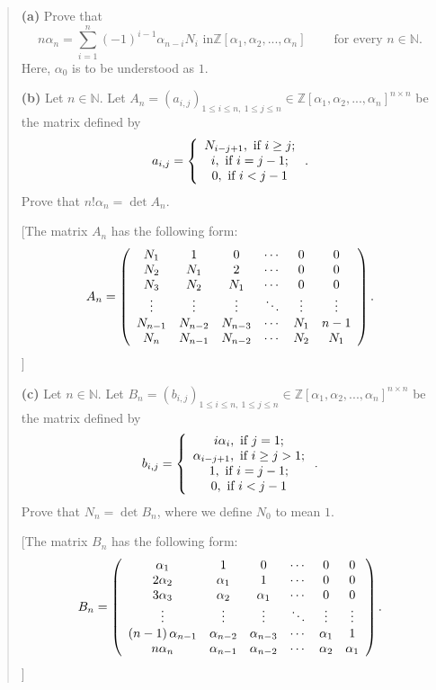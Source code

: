 \documentclass[numbers=enddot,12pt,final,onecolumn,notitlepage]{scrartcl}%
\begin{document}
\begin{quotation}
\textbf{(a)} Prove that
\[
n\alpha_{n}=\sum_{i=1}^{n}\left(  -1\right)  ^{i-1}\alpha_{n-i}N_{i}\text{ in
}\mathbb{Z}\left[  \alpha_{1},\alpha_{2},...,\alpha_{n}\right]
\ \ \ \ \ \ \ \ \ \ \text{for every }n\in\mathbb{N}\text{.}%
\]
Here, $\alpha_{0}$ is to be understood as $1$.

\textbf{(b)} Let $n\in\mathbb{N}$. Let $A_{n}=\left(  a_{i,j}\right)  _{1\leq
i\leq n,\ 1\leq j\leq n}\in\mathbb{Z}\left[  \alpha_{1},\alpha_{2}%
,...,\alpha_{n}\right]  ^{n\times n}$ be the matrix defined by%
\[
a_{i,j}=\left\{
\begin{array}
[c]{c}%
N_{i-j+1},\text{ if }i\geq j;\\
i,\text{ if }i=j-1;\\
0,\text{ if }i<j-1
\end{array}
\right.  .
\]
Prove that $n!\alpha_{n}=\det A_{n}$.

[The matrix $A_{n}$ has the following form:%
\[
A_{n}=\left(
\begin{array}
[c]{cccccc}%
N_{1} & 1 & 0 & \cdots & 0 & 0\\
N_{2} & N_{1} & 2 & \cdots & 0 & 0\\
N_{3} & N_{2} & N_{1} & \cdots & 0 & 0\\
\vdots & \vdots & \vdots & \ddots & \vdots & \vdots\\
N_{n-1} & N_{n-2} & N_{n-3} & \cdots & N_{1} & n-1\\
N_{n} & N_{n-1} & N_{n-2} & \cdots & N_{2} & N_{1}%
\end{array}
\right)  .
\]
]

\textbf{(c)} Let $n\in\mathbb{N}$. Let $B_{n}=\left(  b_{i,j}\right)  _{1\leq
i\leq n,\ 1\leq j\leq n}\in\mathbb{Z}\left[  \alpha_{1},\alpha_{2}%
,...,\alpha_{n}\right]  ^{n\times n}$ be the matrix defined by%
\[
b_{i,j}=\left\{
\begin{array}
[c]{c}%
i\alpha_{i},\text{ if }j=1;\\
\alpha_{i-j+1},\text{ if }i\geq j>1;\\
1,\text{ if }i=j-1;\\
0,\text{ if }i<j-1
\end{array}
\right.  .
\]
Prove that $N_{n}=\det B_{n}$, where we define $N_{0}$ to mean $1$.

[The matrix $B_{n}$ has the following form:%
\[
B_{n}=\left(
\begin{array}
[c]{cccccc}%
\alpha_{1} & 1 & 0 & \cdots & 0 & 0\\
2\alpha_{2} & \alpha_{1} & 1 & \cdots & 0 & 0\\
3\alpha_{3} & \alpha_{2} & \alpha_{1} & \cdots & 0 & 0\\
\vdots & \vdots & \vdots & \ddots & \vdots & \vdots\\
\left(  n-1\right)  \alpha_{n-1} & \alpha_{n-2} & \alpha_{n-3} & \cdots &
\alpha_{1} & 1\\
n\alpha_{n} & \alpha_{n-1} & \alpha_{n-2} & \cdots & \alpha_{2} & \alpha_{1}%
\end{array}
\right)  .
\]
]


\end{quotation}
\end{document}
